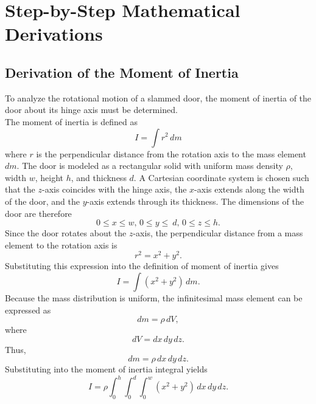 \documentclass[11pt,letterpaper]{article}
\begin{document}
\section{Step-by-Step Mathematical Derivations}
\subsection{Derivation of the Moment of Inertia}
 To analyze the rotational motion of a slammed door, the moment of inertia of the door about its hinge axis must be determined.\\
 The moment of inertia is defined as
 \begin{equation}\label{eq:start}
     I=\int r^2\,dm
 \end{equation}
 where $r$ is the perpendicular distance from the rotation axis to the mass element $dm$. The door is modeled as a rectangular solid with uniform mass density $\rho$, width $w$, height $h$, and thickness $d$. A Cartesian coordinate system is chosen such that the $z$-axis coincides with the hinge axis, the $x$-axis extends along the width of the door, and the $y$-axis extends through its thickness. The dimensions of the door are therefore
\begin{equation}
0 \le x \le w,\,0 \le y \le \ {d},\,0 \le z \le h.
\end{equation}
Since the door rotates about the $z$-axis, the perpendicular distance from a mass element to the rotation axis is
\begin{equation}
r^2=x^2+y^2.
\end{equation}
Substituting this expression into the definition of moment of inertia gives
\begin{equation}
I=\int (x^2+y^2)\,dm.
\end{equation}
Because the mass distribution is uniform, the infinitesimal mass element can be expressed as
\begin{equation}
dm=\rho\,dV,
\end{equation}
where
\begin{equation}
dV=dx\,dy\,dz.
\end{equation}
Thus,
\begin{equation}
dm=\rho\,dx\,dy\,dz.
\end{equation}
Substituting into the moment of inertia integral yields
\begin{equation}
I=\rho\int_0^h\int_{0}^{d}\int_0^w(x^2+y^2)\,dx\,dy\,dz.
\end{equation}
\end{document}
